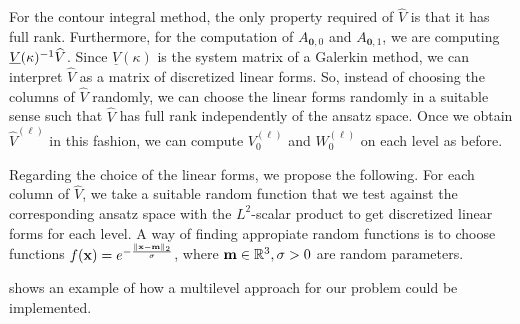 For the contour integral method, the only property required of $\widehat{V}$ is that it has full rank.
Furthermore, for the computation of $A_{\mathbf{0},0}$ and $A_{\mathbf{0},1}$, we are computing $\underline{V}(\kappa)^{-1} \widehat{V}$.
Since $\underline{V}(\kappa)$ is the system matrix of a Galerkin method, we can interpret $\widehat{V}$ as a matrix of discretized linear forms.
So, instead of choosing the columns of $\widehat{V}$ randomly, we can choose the linear forms randomly in a suitable sense such that $\widehat{V}$ has full rank independently of the ansatz space.
Once we obtain $\widehat{V}^{(\ell)}$ in this fashion, we can compute $V_0^{(\ell)}$ and $W_0^{(\ell)}$ on each level as before.

Regarding the choice of the linear forms, we propose the following.
For each column of $\widehat{V}$, we take a suitable random function that we test against the corresponding ansatz space with the $L^2$-scalar product to get discretized linear forms for each level.
A way of finding appropiate random functions is to choose functions $f(\mathbf{x}) = e^{-\frac{\lVert\mathbf{x} - \mathbf{m}\rVert_2}{\sigma}}$, where $\mathbf{m} \in \mathbb{R}^3, \sigma >0$ are random parameters.

 shows an example of how a multilevel approach for our problem could be implemented.

